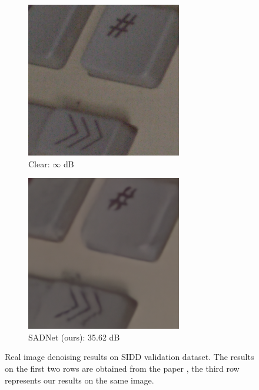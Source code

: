 \begin{figure}[t!]
\begin{subfigure}{0.28\textwidth}
        \includegraphics[width=\linewidth]{images/tus_gt.png}
        \caption{Clear: $\infty$ dB}
        \label{fig:tus_clear}
    \end{subfigure}\hfil %
    \begin{subfigure}{0.28\textwidth}
        \includegraphics[width=\linewidth]{images/tus_out.png}
        \caption{SADNet (ours): 35.62 dB}
        \label{fig:tus_out}
    \end{subfigure}\hfil %
    \caption{Real image denoising results on SIDD validation dataset. The results on the first two rows are obtained from the paper \cite{10.1007/978-3-030-58577-8_11},  the third row represents our results on the same image.}
    \label{fig:tus}
\end{figure}

